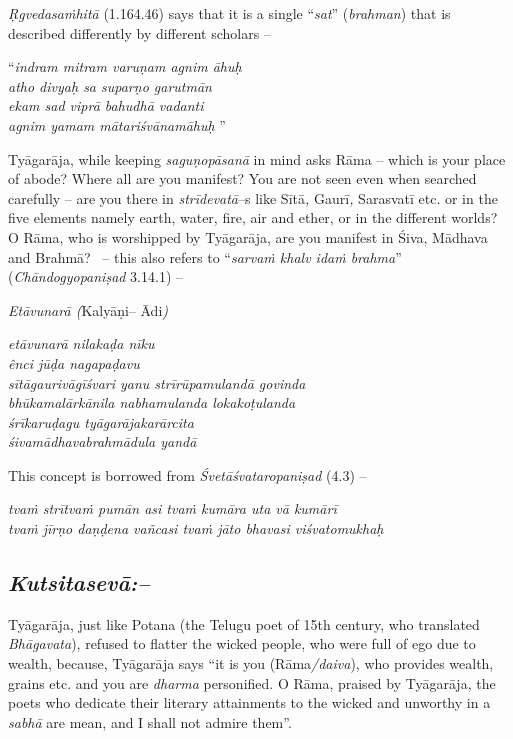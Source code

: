 \textit{Ṛgvedasaṁhitā} (1.164.46) says that it is a single “\textit{sat}” (\textit{brahman}) that is described differently by different scholars –

\begin{myquote}
“\textit{indram mitram varuṇam agnim āhuḥ}\\\textit{atho divyaḥ sa suparṇo garutmān} \\\textit{ekam sad viprā bahudhā vadanti}\\\textit{agnim yamam mātariśvānamāhuḥ} ”
\end{myquote}

Tyāgarāja, while keeping \textit{saguṇopāsanā} in mind asks Rāma – which is your place of abode? Where all are you manifest? You are not seen even when searched carefully – are you there in \textit{strīdevatā}–s like Sītā\textit{,} Gaurī\textit{,} Sarasvatī etc. or in the five elements namely earth, water, fire, air and ether, or in the different worlds? O Rāma, who is worshipped by Tyāgarāja, are you manifest in Śiva, Mādhava and Brahmā?  – this also refers to “\textit{sarvaṁ khalv idaṁ brahma}” (\textit{Chāndogyopaniṣad} 3.14.1) – 

\textit{Etāvunarā (}Kalyāṇi– Ādi\textit{)}

\begin{myquote}
\textit{etāvunarā nilakaḍa nīku}\\\textit{ênci jūḍa nagapaḍavu}\\\textit{sītāgaurivāgīśvari yanu strīrūpamulandā govinda}\\\textit{bhūkamalārkānila nabhamulanda lokakoṭulanda}\\\textit{śrīkaruḍagu tyāgarājakarārcita}\\\textit{śivamādhavabrahmādula yandā}
\end{myquote}

This concept is borrowed from \textit{Śvetāśvataropaniṣad} (4.3) –

\begin{myquote}
\textit{tvaṁ strītvaṁ pumān asi tvaṁ kumāra uta vā kumārī }\\\textit{tvaṁ jīrṇo daṇḍena vañcasi tvaṁ jāto bhavasi viśvatomukhaḥ} 
\end{myquote}


\subsection*{\textit{Kutsitasevā:–}}

Tyāgarāja, just like Potana (the Telugu poet of 15th century, who translated \textit{Bhāgavata}), refused to flatter the wicked people, who were full of ego due to wealth, because, Tyāgarāja says “it is you (Rāma\textit{/daiva}), who provides wealth, grains etc. and you are \textit{dharma} personified. O Rāma, praised by Tyāgarāja, the poets who dedicate their literary attainments to the wicked and unworthy in a \textit{sabhā} are mean, and I shall not admire them”. 

